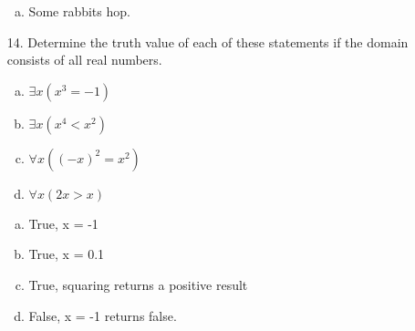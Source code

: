 \begin{itemize}
\begin{enumerate}[a.]
    \item Some rabbits hop.
\end{enumerate}
\item[14.] Determine the truth value of each of these statements if the domain consists of all real numbers.
\begin{enumerate}[a.]
    \item $\exists x(x^3 = -1)$
    \item $\exists x(x^4 < x^2)$
    \item $\forall x((-x)^2 = x^2)$
    \item $\forall x(2x > x)$
\end{enumerate}
\begin{enumerate}[a.]
    \item True, x = -1
    \item True, x = 0.1
    \item True, squaring returns a positive result
    \item False, x = -1 returns false.
\end{enumerate}
\end{itemize}


